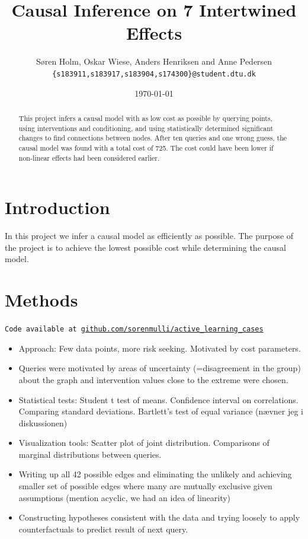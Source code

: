 \documentclass[12pt,fleqn,]{article}
\title{\vspace*{-3.75cm}Causal Inference on 7 Intertwined Effects}
\author{\small Søren Holm, Oskar Wiese, Anders Henriksen and Anne Pedersen \\
\small {\texttt{\{s183911,s183917,s183904,s174300\}@student.dtu.dk}}}
\date{\small \today}
\begin{document}
\maketitle

\vspace*{-1cm}
\begin{abstract}
This project infers a causal model with as low cost as possible by querying points, using interventions and conditioning, and using statistically determined significant changes to find connections between nodes. After ten queries and one wrong guess, the causal model was found with a total cost of 725. The cost could have been lower if non-linear effects had been considered earlier.
\end{abstract}


\begin{multicols}{2}
	
	
\section{Introduction} 

In this project we infer a causal model as efficiently as possible. The purpose of the project is to achieve the lowest possible cost while determining the causal model. 

\section{Methods}
\texttt{Code available at \url{github.com/sorenmulli/active_learning_cases}} \newline
\begin{itemize}[noitemsep]
	\item Approach: Few data points, more risk seeking. Motivated by cost parameters.
	\item Queries were motivated by areas of uncertainty (=disagreement in the group) about the graph and intervention values close to the extreme were chosen.
	\item Statistical tests: Student t test of means. Confidence interval on correlations. Comparing standard deviations. Bartlett's test of equal variance (nævner jeg i diskussionen)
	\item Visualization tools: Scatter plot of joint distribution. Comparisons of marginal distributions between queries.
	\item Writing up all 42 possible edges and eliminating the unlikely and achieving smaller set of possible edges where many are mutually exclusive given assumptions (mention acyclic, we had an idea of linearity)
	\item Constructing hypotheses consistent with the data and trying loosely to apply counterfactuals to predict result of next query.
\end{itemize}


\end{multicols}
\end{document}
